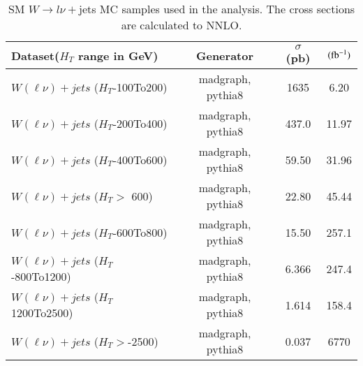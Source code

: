 \begin{table}[h]
\centering
\caption{SM $W\rightarrow l \nu+$jets MC samples used in the analysis. The cross
  sections are calculated to NNLO. }
\label{tab:wjetsMCsamples}
{\footnotesize
\begin{tabular}{lccc}
\hline \hline
Dataset($H_{T}$ range in GeV) & Generator &$\sigma$ (pb) & $(\rm fb^{-1})$ \\
\hline
$W(\ell\nu)+jets$ ($ H_{T}$-100To200) & madgraph, pythia8 & 1635 & 6.20\\
$W(\ell\nu)+jets$ ($ H_{T}$-200To400) & madgraph, pythia8 & 437.0 & 11.97\\
$W(\ell\nu)+jets$ ($ H_{T}$-400To600) & madgraph, pythia8 & 59.50 & 31.96\\
$W(\ell\nu)+jets$ ($ H_{T} > $ 600) & madgraph, pythia8 & 22.80 & 45.44\\
$W(\ell\nu)+jets$ ($ H_{T}$-600To800) & madgraph, pythia8 & 15.50 & 257.1\\
$W(\ell\nu)+jets$ ($ H_{T}$-800To1200) & madgraph, pythia8 & 6.366 & 247.4\\
$W(\ell\nu)+jets$ ($ H_{T}$1200To2500) & madgraph, pythia8 & 1.614 & 158.4\\
$W(\ell\nu)+jets$ ($ H_{T} > $-2500) & madgraph, pythia8 & 0.037 & 6770\\
\hline \hline
\end{tabular}
}
\end{table}

